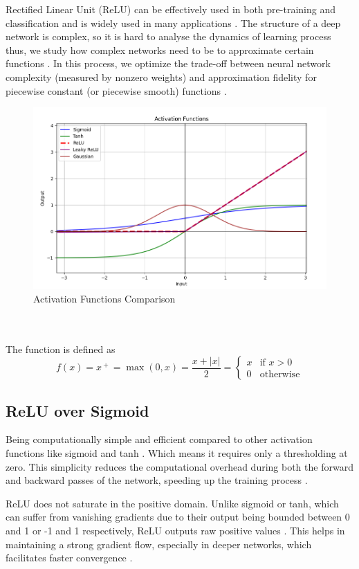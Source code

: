 \documentclass[conference]{IEEEtran}
\begin{document}
Rectified Linear Unit (ReLU) can be effectively used in both pre-training and classification and is widely used in many applications \cite{b7}. The structure of a deep network is complex, so it is hard to analyse the dynamics of learning process thus, we study how complex networks need to be to approximate certain functions \cite{b7}. In this process, we optimize the trade-off between neural network complexity (measured by nonzero weights) and approximation fidelity for piecewise constant (or piecewise smooth) functions \cite{b7}.
\begin{figure}[h]
    \centering
    \includegraphics[width=\linewidth]{Activation_Functions_Compare.PNG}
    \caption{Activation Functions Comparison}
    \label{fig}
\end{figure}
\\
\\
The function is defined as
\[f(x) = x^{\ +\ } = \max(0,x) = \frac{x+|x|}{2} = \begin{cases}
    x & \text{if } x > 0 \\
    0 & \text{otherwise}
\end{cases}
\]

\subsection{ReLU over Sigmoid}

Being computationally simple and efficient compared to other activation functions like sigmoid and tanh \cite{b30}. Which means it requires only a thresholding at zero\cite{b30}. This simplicity reduces the computational overhead during both the forward and backward passes of the network, speeding up the training process \cite{b30}.

ReLU does not saturate in the positive domain. Unlike sigmoid or tanh, which can suffer from vanishing gradients due to their output being bounded between 0 and 1 or -1 and 1 respectively, ReLU outputs raw positive values \cite{b30}. This helps in maintaining a strong gradient flow, especially in deeper networks, which facilitates faster convergence \cite{b31}.
\end{document}

